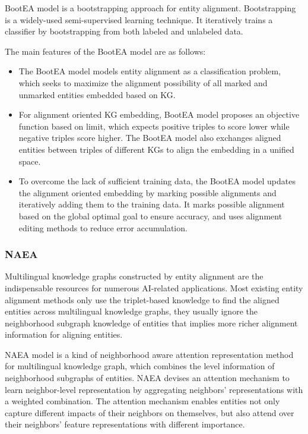 \documentclass[sigconf]{acmart}
\begin{document}
{BootEA model is a bootstrapping approach for entity alignment. Bootstrapping is a widely-used semi-supervised learning technique. It iteratively trains a classifier by bootstrapping from both labeled and unlabeled data. 

The main features of the BootEA model are as follows:
\begin{itemize}
\item The BootEA model models entity alignment as a classification problem, which seeks to maximize the alignment possibility of all marked and unmarked entities embedded based on KG.
\item For alignment oriented KG embedding, BootEA model proposes an objective function based on limit, which expects positive triples to score lower while negative triples score higher. The BootEA model also exchanges aligned entities between triples of different KGs to align the embedding in a unified space.
\item To overcome the lack of sufficient training data, the BootEA model updates the alignment oriented embedding by marking possible alignments and iteratively adding them to the training data. It marks possible alignment based on the global optimal goal to ensure accuracy, and uses alignment editing methods to reduce error accumulation.
\end{itemize}

\subsubsection{NAEA \cite{zhu2019neighborhood}}

Multilingual knowledge graphs constructed by entity alignment are the indispensable resources for numerous AI-related applications. Most existing entity alignment methods only use the triplet-based knowledge to find the aligned entities across multilingual knowledge graphs, they usually ignore the neighborhood subgraph knowledge of entities that implies more richer alignment information for aligning entities.

NAEA model is a kind of neighborhood aware attention representation method for multilingual knowledge graph, which combines the level information of neighborhood subgraphs of entities. NAEA devises an attention mechanism to learn neighbor-level representation by aggregating neighbors’ representations with a weighted combination. The attention mechanism enables entities not only capture different impacts of their neighbors on themselves, but also attend over their neighbors’ feature representations with different importance.

}
\end{document}
